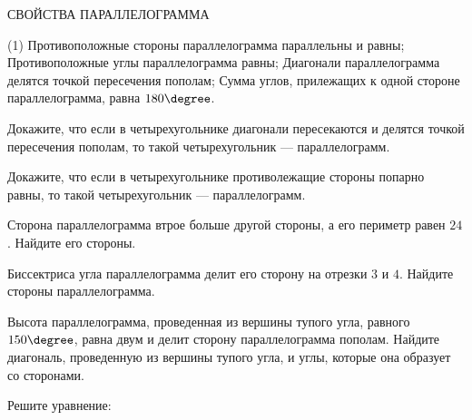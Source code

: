 %
\begin{class}[number=5]
	\begin{center}
		СВОЙСТВА ПАРАЛЛЕЛОГРАММА 
	\end{center}
	\begin{tasks}(1)
		\task Противоположные стороны параллелограмма параллельны и равны;
		\task Противоположные углы параллелограмма равны;
		\task Диагонали параллелограмма делятся точкой пересечения пополам;
		\task Сумма углов, прилежащих к одной стороне параллелограмма, равна \( 180\degree \).
	\end{tasks}
	\begin{listofex}
		\item Докажите, что если в четырехугольнике диагонали пересекаются и делятся точкой пересечения пополам, то такой четырехугольник --- параллелограмм.
		\item Докажите, что если в четырехугольнике противолежащие стороны попарно равны, то такой четырехугольник --- параллелограмм.
		\item Сторона параллелограмма втрое больше другой стороны, а его периметр равен \( 24 \).
		Найдите его стороны.
		\item Биссектриса угла параллелограмма делит его сторону на отрезки \( 3 \) и \( 4 \).
		Найдите стороны параллелограмма.
		\item Высота параллелограмма, проведенная из вершины тупого угла, равного \( 150\degree \), равна двум и делит сторону параллелограмма пополам. Найдите диагональ, проведенную из вершины тупого угла, и углы, которые она образует со сторонами.
		\item Решите уравнение:
		\begin{enumcols}[itemcolumns=2]
			\item {}
			\item {}
			\item {}
			\item {}
		\end{enumcols}
	\end{listofex}
\end{class}
%
%
